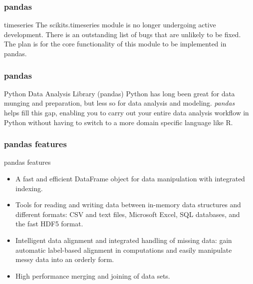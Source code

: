 \documentclass[10pt, colorlinks]{beamer}
\begin{document}
\begin{frame}[fragile]\frametitle{pandas}
\begin{block}{timeseries}
The scikits.timeseries module is no longer undergoing active development. There is an outstanding list of bugs that are unlikely to be fixed. The plan is for the core functionality of this module to be implemented in pandas.
\end{block}
\end{frame}
\begin{frame}[fragile]\frametitle{pandas}
\begin{block}{Python Data Analysis Library (pandas)}
Python has long been great for data munging and preparation, but less so for data analysis and modeling. \emph{pandas} helps fill this gap, enabling you to carry out your entire data analysis workflow in Python without having to switch to a more domain specific language like R.
\end{block}

\end{frame}
\begin{frame}[fragile]\frametitle{pandas features}
\begin{block}{pandas features}
\begin{itemize}
    \item A fast and efficient DataFrame object for data manipulation with integrated indexing.
    \item Tools for reading and writing data between in-memory data structures and different formats: CSV and text files, Microsoft Excel, SQL databases, and the fast HDF5 format.
    \item Intelligent data alignment and integrated handling of missing data: gain automatic label-based alignment in computations and easily manipulate messy data into an orderly form.
    \item High performance merging and joining of data sets.
\end{itemize}
\end{block}

\end{frame}
\end{document}
